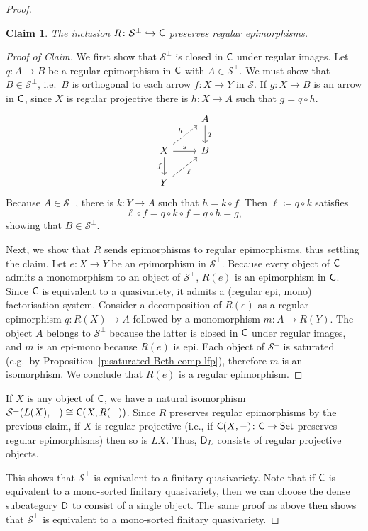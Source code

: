 \documentclass[a4paper,10pt,reqno]{amsart}
\newtheorem{claim}[theorem]{Claim}
\theoremstyle{definition}
\theoremstyle{remark}
\newcommand{\cat}{{\sf C}}								%
\newcommand{\catt}{{\sf D}}								%
\newcommand{\Set}{{\sf Set}}								%
\newcommand{\ar}[1]{\mathcal{#1}}							%
\newcommand{\into}{\hookrightarrow}						%
\newcommand{\ort}[1]{{#1}^{\perp}}						%
\begin{document}
\begin{proof}
\begin{claim}
The inclusion $R\colon \ort{\ar{S}} \into \cat$ preserves regular epimorphisms.
\end{claim}

\begin{proof}[Proof of Claim]
We first show that $\ort{\ar{S}}$ is closed in $\cat$ under regular images. Let $q\colon A\to B$ be a regular epimorphism in $\cat$ with $A\in \ort{\ar{S}}$. We must show that $B\in \ort{\ar{S}}$, i.e.\ $B$ is orthogonal to each arrow $f\colon X \to Y$ in $\ar{S}$. If $g\colon X\to B$ is an arrow in $\cat$, since $X$ is  regular projective there is $h\colon X\to A$ such that $g = q\circ h$.
%
\[\begin{tikzcd}
{} & A \arrow{d}{q} \\
X \arrow{r}{g} \arrow{d}[swap]{f} \arrow[dashed]{ur}{h} & B \\
Y \arrow[dashed]{ur}[swap]{\ell} & {}
\end{tikzcd}\]
Because $A\in \ort{\ar{S}}$, there is $k\colon Y\to A$ such that $h = k\circ f$. Then $\ell\coloneqq q\circ k$ satisfies
\[
\ell \circ f = q\circ k \circ f = q\circ h = g,
\]
showing that $B\in \ort{\ar{S}}$.

Next, we show that $R$ sends epimorphisms to regular epimorphisms, thus settling the claim. Let $e\colon X\to Y$ be an epimorphism in $\ort{\ar{S}}$. Because every object of $\cat$ admits a monomorphism to an object of $\ort{\ar{S}}$, $R(e)$ is an epimorphism in $\cat$. Since $\cat$ is equivalent to a quasivariety, it admits a (regular epi, mono) factorisation system. Consider a decomposition of $R(e)$ as a regular epimorphism $q\colon R(X)\to A$ followed by a monomorphism $m\colon A\to R(Y)$. The object $A$ belongs to $\ort{\ar{S}}$ because the latter is closed in $\cat$ under regular images, and $m$ is an epi-mono because $R(e)$ is epi. Each object of $\ort{\ar{S}}$ is saturated (e.g.\ by Proposition~\ref{p:saturated-Beth-comp-lfp}), therefore $m$ is an isomorphism. We conclude that $R(e)$ is a regular epimorphism.
\end{proof}


If $X$ is any object of $\cat$, we have a natural isomorphism $\ort{\ar{S}}(L(X),-)\cong \cat(X,R(-))$. Since $R$ preserves regular epimorphisms by the previous claim, if $X$ is regular projective (i.e., if $\cat(X,-)\colon \cat\to\Set$ preserves regular epimorphisms) then so is $LX$. Thus, $\catt_{L}$ consists of regular projective objects.

This shows that $\ort{\ar{S}}$ is equivalent to a finitary quasivariety. Note that if $\cat$ is equivalent to a mono-sorted finitary quasivariety, then we can choose the dense subcategory $\catt$ to consist of a single object. The same proof as above then shows that $\ort{\ar{S}}$ is equivalent to a mono-sorted finitary quasivariety.


\end{proof}
\end{document}
